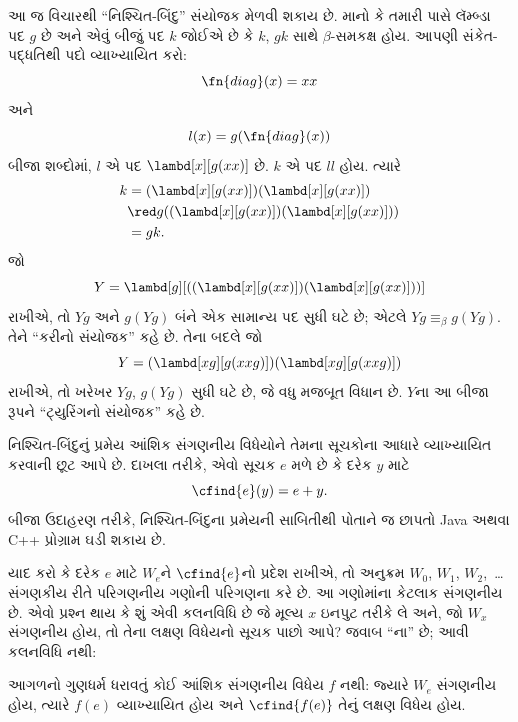 \begin{digress}
આ જ વિચારથી ``નિશ્ચિત-બિંદુ'' સંયોજક મેળવી શકાય છે.
માનો કે તમારી પાસે લૅમ્બ્ડા પદ $g$ છે અને એવું બીજું
પદ $k$ જોઈએ છે કે $k$, $gk$ સાથે $\beta$-સમકક્ષ હોય.
આપણી સંકેત-પદ્ધતિથી પદો વ્યાખ્યાયિત કરો:
\[
\fn{diag}(x) = xx
\]
અને
\[
l(x) = g(\fn{diag}(x))
\]
બીજા શબ્દોમાં, $l$ એ પદ $\lambd[x][g(xx)]$ છે. $k$
એ પદ $ll$ હોય. ત્યારે
\begin{align*}
k & = (\lambd[x][g(xx)])(\lambd[x][g(xx)]) \\
& \red  g((\lambd[x][g(xx)])(\lambd[x][g(xx)])) \\
& = gk.
\end{align*}
જો
\[
Y = \lambd[g][((\lambd[x][g(xx)])(\lambd[x][g(xx)]))]
\]
રાખીએ, તો $Yg$ અને $g(Yg)$ બંને એક સામાન્ય પદ સુધી
ઘટે છે; એટલે $Yg \equiv_\beta
g(Yg)$. તેને ``કરીનો સંયોજક'' કહે છે. તેના બદલે જો
\[
Y = (\lambd[xg][g(xxg)])(\lambd[xg][g(xxg)])
\]
રાખીએ, તો ખરેખર $Yg$, $g(Yg)$ સુધી ઘટે છે, જે વધુ
મજબૂત વિધાન છે. $Y$ના આ બીજા રૂપને ``ટ્યુરિંગનો
સંયોજક'' કહે છે.
\end{digress}
\endgroup


\begingroup
\makeatletter{}\makeatother

\label{guunit:OLP-0250}


નિશ્ચિત-બિંદુનું પ્રમેય આંશિક સંગણનીય વિધેયોને તેમના
સૂચકોના આધારે વ્યાખ્યાયિત કરવાની છૂટ આપે છે. દાખલા
તરીકે, એવો સૂચક $e$ મળે છે કે દરેક $y$ માટે
\[
\cfind{e}(y) = e + y.
\]
બીજા ઉદાહરણ તરીકે, નિશ્ચિત-બિંદુના પ્રમેયની સાબિતીથી
પોતાને જ છાપતો Java અથવા C++ પ્રોગ્રામ ઘડી શકાય છે.

યાદ કરો કે દરેક $e$ માટે $W_e$ને $\cfind{e}$નો પ્રદેશ
રાખીએ, તો અનુક્રમ $W_0$, $W_1$, $W_2$,~\dots સંગણકીય
રીતે પરિગણનીય ગણોની પરિગણના કરે છે. આ ગણોમાંના કેટલાક
સંગણનીય છે. એવો પ્રશ્ન થાય કે શું એવી કલનવિધિ છે જે
મૂલ્ય $x$ ઇનપુટ તરીકે લે અને, જો $W_x$ સંગણનીય હોય,
તો તેના લક્ષણ વિધેયનો સૂચક પાછો આપે? જવાબ ``ના'' છે;
આવી કલનવિધિ નથી:

\begin{thm}
આગળનો ગુણધર્મ ધરાવતું કોઈ આંશિક સંગણનીય વિધેય $f$
નથી: જ્યારે $W_e$ સંગણનીય હોય, ત્યારે $f(e)$
વ્યાખ્યાયિત હોય અને $\cfind{f(e)}$ તેનું લક્ષણ વિધેય હોય.
\end{thm}

